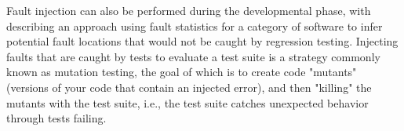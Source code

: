 Fault injection can also be performed during the developmental phase, with~\citet{natella2012fault} describing an approach using fault statistics for a category of software to infer potential fault locations that would not be caught by regression testing. Injecting faults that are caught by tests to evaluate a test suite is a strategy commonly known as mutation testing, the goal of which is to create code "mutants" (versions of your code that contain an injected error), and then "killing" the mutants with the test suite, i.e.,  the test suite catches unexpected behavior through tests failing.

